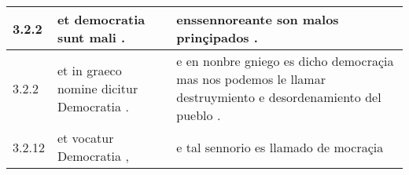 \begin{tabular}{|p{1cm}|p{6.5cm}|p{6.5cm}|}

\hline
3.2.2 & et democratia sunt mali . & enssennoreante son malos prinçipados . \\\hline
3.2.2 & et in graeco nomine dicitur Democratia . & e en nonbre gniego es dicho democraçia mas nos podemos le llamar destruymiento e desordenamiento del pueblo . \\\hline
3.2.12 & et vocatur Democratia , & e tal sennorio es llamado de mocraçia \\\hline

\end{tabular}
